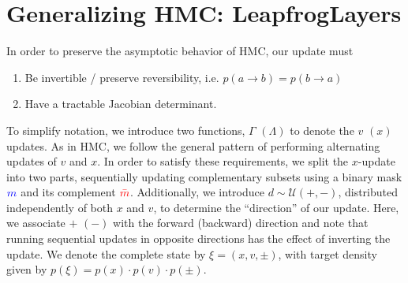 \documentclass[a4paper,11pt]{article}
\newcommand{\mask}{\textcolor{blue}{m}}
\newcommand{\maskbar}{\textcolor{red}{\bar{m}}}
\begin{document}
\section{\label{sec:l2hmc}Generalizing HMC: LeapfrogLayers}
%
In order to preserve the asymptotic behavior of HMC, our update must
%
\begin{enumerate}
    \item Be invertible / preserve reversibility, i.e. \(p(a\rightarrow b) =
        p(b\rightarrow a)\)
    \item Have a tractable Jacobian determinant.
\end{enumerate}
%
To simplify notation, we introduce two functions, \(\Gamma\) \((\Lambda)\) to
denote the \(v\) \((x)\) updates.
%
As in HMC, we follow the general pattern of performing alternating updates of
\(v\) and \(x\).
%
In order to satisfy these requirements, we split the \(x\)-update
into two parts, sequentially updating complementary subsets using a binary mask
\(\mask\) and its complement \(\maskbar\).
%
Additionally, we introduce \(d \sim \mathcal{U}(+, -)\), distributed
independently of both \(x\) and \(v\), to determine the ``direction'' of our
update.
%
Here, we associate \(+\) \((-)\) with the forward (backward) direction and note
that running sequential updates in opposite directions has the effect of
inverting the update.
%
We denote the complete state by \(\xi = (x, v, \pm)\), with target density
given by \(p(\xi) = p(x)\cdot p(v)\cdot p(\pm)\).
%
\end{document}

